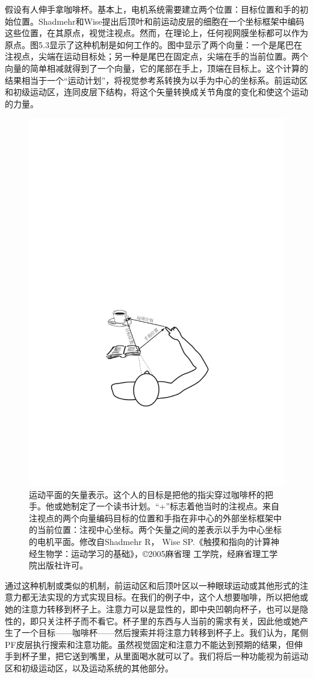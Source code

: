 假设有人伸手拿咖啡杯。基本上，电机系统需要建立两个位置：目标位置和手的初始位置。Shadmehr和Wise提出后顶叶和前运动皮层的细胞在一个坐标框架中编码这些位置，在其原点，视觉注视点。然而，在理论上，任何视网膜坐标都可以作为原点。图5.3显示了这种机制是如何工作的。图中显示了两个向量：一个是尾巴在注视点，尖端在运动目标处；另一种是尾巴在固定点，尖端在手的当前位置。两个向量的简单相减就得到了一个向量，它的尾部在手上，顶端在目标上。这个计算的结果相当于一个“运动计划”，将视觉参考系转换为以手为中心的坐标系。前运动区和初级运动区，连同皮层下结构，将这个矢量转换成关节角度的变化和使这个运动的力量。
\begin{figure}
	\centering
	\includegraphics[width=0.7\linewidth]{image_pfc/Fig_5_3}
	\caption{运动平面的矢量表示。这个人的目标是把他的指尖穿过咖啡杯的把手。他或她制定了一个读书计划。“+”标志着他当时的注视点。来自注视点的两个向量编码目标的位置和手指在非中心的外部坐标框架中的当前位置：注视中心坐标。两个矢量之间的差表示以手为中心坐标的电机平面。修改自Shadmehr R， Wise SP.《触摸和指向的计算神经生物学：运动学习的基础》，©2005麻省理 工学院，经麻省理工学院出版社许可。}
	\label{fig:fig}
\end{figure}
通过这种机制或类似的机制，前运动区和后顶叶区以一种眼球运动或其他形式的注意力都无法实现的方式实现目标。在我们的例子中，这个人想要咖啡，所以把他或她的注意力转移到杯子上。注意力可以是显性的，即中央凹朝向杯子，也可以是隐性的，即只关注杯子而不看它。杯子里的东西与人当前的需求有关，因此他或她产生了一个目标——咖啡杯——然后搜索并将注意力转移到杯子上。我们认为，尾侧PF皮层执行搜索和注意功能。虽然视觉固定和注意力不能达到预期的结果，但伸手到杯子里，把它送到嘴里，从里面喝水就可以了。我们将后一种功能视为前运动区和初级运动区，以及运动系统的其他部分。

